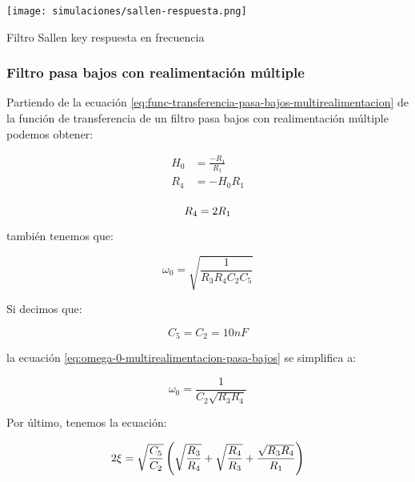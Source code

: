 \begin{ilustracion}[ht]
    \centering
    \texttt{[image: simulaciones/sallen-respuesta.png]}
    \caption{Filtro Sallen key respuesta en frecuencia  }
\end{ilustracion}

\FloatBarrier
\subsubsection{Filtro pasa bajos con realimentación múltiple}

Partiendo de la ecuación \ref{eq:func-transferencia-pasa-bajos-multirealimentacion} de la función de transferencia de un filtro pasa bajos con realimentación múltiple podemos obtener:

\begin{align*}
    H_0 &= \frac{-R_4}{R_1} \\
    R_4 &= - H_0 R_1 \\
\end{align*}

\begin{equation}
    R_4 = 2 R_1\\
    \label{eq:r4-multirealimentacion-pasa-bajos}
\end{equation}

también tenemos que: 

\begin{equation}
    \omega_0 = \sqrt{\frac{1}{R_3 R_4 C_2 C_5}}
    \label{eq:omega-0-multirealimentacion-pasa-bajos}
\end{equation}

Si decimos que: 

\begin{equation*}
    \boxed{C_5 = C_2 = 10nF}
\end{equation*}

la ecuación \ref{eq:omega-0-multirealimentacion-pasa-bajos} se simplifica a:

\begin{equation}
    \omega_0 = \frac{1}{C_2\sqrt{R_3 R_4}}
    \label{eq:omega-0-multirealimentacion-pasa-bajos-simple}
\end{equation}

Por último, tenemos la ecuación:

\begin{equation}
    2\xi = \sqrt{\frac{C_5}{C_2}} \left( \sqrt{\frac{R_3}{R_4}} + \sqrt{\frac{R_4}{R_3}} + \frac{\sqrt{R_3 R_4}}{R_1} \right)
    \label{eq:factor-amortiguamiento-multirealimentacion-pasa-bajos}
\end{equation}



